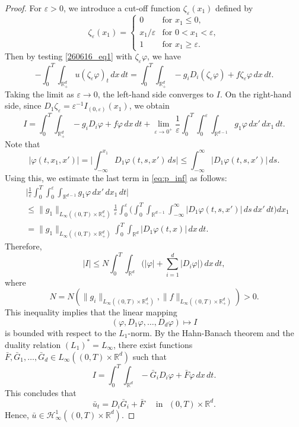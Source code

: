 \documentclass[reqno]{amsart}
\numberwithin{equation}{section}
\theoremstyle{plain}
\theoremstyle{definition}
\def\bR{\mathbb{R}}
\def\cH{\mathcal{H}}
\begin{document}
\begin{proof}
For $\varepsilon > 0$, we introduce a cut-off function $\zeta_\varepsilon(x_1)$ defined by
\[
\zeta_\varepsilon(x_1) = 
\begin{cases}
    0 & \text{for } x_1 \le 0, \\[4pt]
    x_1/\varepsilon & \text{for } 0 < x_1 < \varepsilon, \\[4pt]
    1 & \text{for } x_1 \ge \varepsilon.
\end{cases}
\]
Then by testing \eqref{260616_eq1} with $\zeta_{\varepsilon}\varphi$, we have
$$
-\int_0^T \int_{\bR^d_+} u (\zeta_\varepsilon \varphi)_t \,dx\,dt = \int_0^T \int_{\bR^d_+} - g_i D_i(\zeta_\varepsilon \varphi) + f \zeta_\varepsilon \varphi  \,dx\,dt.
$$
Taking the limit as $\varepsilon \to 0$, the left-hand side converges to $I$. 
On the right-hand side, since $D_1 \zeta_\varepsilon = \varepsilon^{-1} I_{(0, \varepsilon)}(x_1)$, we obtain
\begin{equation}
    \label{eq:p_inf}
I = \int_0^T \int_{\bR^d_+} - g_i D_i \varphi + f \varphi  \,dx\,dt + \lim_{\varepsilon \to 0^+} \frac{1}{\varepsilon} \int_0^T \int_0^\varepsilon \int_{\bR^{d-1}} g_1 \varphi \,dx'\,dx_1\,dt.
\end{equation}
Note that
$$
|\varphi(t, x_1, x')| = \bigg| \int_{-\infty}^{x_1} D_1 \varphi(t, s, x') \,ds \bigg| \le \int_{-\infty}^\infty |D_1 \varphi(t, s, x')| \,ds.
$$
Using this, we estimate the last term in \eqref{eq:p_inf} as follows:
$$
\begin{aligned}
&\bigg| \frac{1}{\varepsilon} \int_0^T \int_0^\varepsilon \int_{\bR^{d-1}} g_1 \varphi \,dx'\,dx_1\,dt \bigg| \\
&\le \|g_1\|_{L_\infty((0,T)\times \bR^d_+)} \frac{1}{\varepsilon} \int_0^\varepsilon \bigg( \int_0^T \int_{\bR^{d-1}} \int_{-\infty}^\infty |D_1 \varphi(t,s, x')| \,ds \,dx'\,dt \bigg) dx_1 \\
&= \|g_1\|_{L_\infty((0,T)\times \bR^d_+)} \int_0^T \int_{\bR^d} |D_1 \varphi(t, x)| \,dx\,dt.
\end{aligned}
$$
Therefore, 
$$
|I| \le N \int_0^T \int_{\bR^d} \bigg( |\varphi| + \sum_{i=1}^d |D_i \varphi| \bigg) \,dx\,dt,
$$
where
\[
N=N\left(\|g_i\|_{L_\infty((0,T)\times \bR^d_+)}, \|f\|_{L_\infty((0,T)\times \bR^d_+)}\right) > 0.
\]
This inequality implies that the linear mapping
\[
(\varphi, D_1 \varphi, \dots, D_d \varphi) \mapsto I
\]
is bounded with respect to the $L_1$-norm.
By the Hahn-Banach theorem and the duality relation $(L_1)^* = L_\infty$, there exist functions $\bar{F}, \bar{G}_1, \dots, \bar{G}_d \in L_\infty((0,T)\times \bR^d)$ such that
$$
I = \int_0^T \int_{\bR^d} -\bar{G}_i D_i \varphi +  \bar{F} \varphi \,dx\,dt.
$$
This concludes that
\[
\bar{u}_t = D_i \bar{G}_i + \bar{F} \quad \textrm{ in }\,\, (0,T)\times \bR^d.
\]
Hence, $\bar{u} \in \cH^1_\infty((0,T)\times \bR^d)$.
\end{proof}
\end{document}
